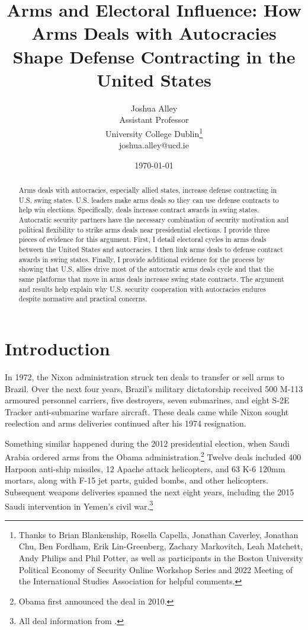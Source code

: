 \documentclass[12pt]{article}
\title{\textbf{Arms and Electoral Influence: How Arms Deals with Autocracies Shape Defense Contracting in the United States}}
\author{Joshua Alley \\
Assistant Professor \\
University College Dublin\thanks{Thanks to Brian Blankenship, Rosella Capella, Jonathan Caverley, Jonathan Chu, Ben Fordham, Erik Lin-Greenberg, Zachary Markovitch, Leah Matchett, Andy Philips and Phil Potter, as well as participants in the Boston University Political Economy of Security Online Workshop Series and 2022 Meeting of the International Studies Association for helpful comments.} \\
joshua.alley@ucd.ie
}
\date{\today}
\begin{document}
\maketitle 

\begin{abstract} 
Arms deals with autocracies, especially allied states, increase defense contracting in U.S. swing states. 
U.S. leaders make arms deals so they can use defense contracts to help win elections.
Specifically, deals increase contract awards in swing states. 
Autocratic security partners have the necessary combination of security motivation and political flexibility to strike arms deals near presidential elections. 
I provide three pieces of evidence for this argument.  
First, I detail electoral cycles in arms deals between the United States and autocracies. 
I then link arms deals to defense contract awards in swing states.
Finally, I provide additional evidence for the process by showing that U.S. allies drive most of the autocratic arms deals cycle and that the same platforms that move in arms deals increase swing state contracts.  
The argument and results help explain why U.S. security cooperation with autocracies endures despite normative and practical concerns.
\end{abstract} 



\newpage 
\doublespace 


\section{Introduction}



In 1972, the Nixon administration struck ten deals to transfer or sell arms to Brazil.
Over the next four years, Brazil's military dictatorship received 500 M-113 armoured personnel carriers, five destroyers, seven submarines, and eight S-2E Tracker anti-submarine warfare aircraft.
These deals came while Nixon sought reelection and arms deliveries continued after his 1974 resignation. 


Something similar happened during the 2012 presidential election, when Saudi Arabia ordered arms from the Obama administration.\footnote{Obama first announced the deal in 2010.} 
Twelve deals included 400 Harpoon anti-ship missiles, 12 Apache attack helicopters, and 63 K-6 120mm mortars, along with F-15 jet parts, guided bombs, and other helicopters. 
Subsequent weapons deliveries spanned the next eight years, including the 2015 Saudi intervention in Yemen's civil war.\footnote{All deal information from \citep{SIPRI2021}.}
\end{document}

